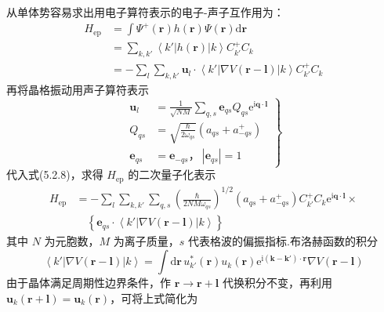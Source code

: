 从单体势容易求出用电子算符表示的电子-声子互作用为：
\begin{equation}
\begin{aligned}
  H_{\mathrm{ep}}&=\int\varPsi^{+}\left(\boldsymbol{r}\right)h\left(\boldsymbol{r}\right)\varPsi\left(\boldsymbol{r}\right)\mathrm{d}\boldsymbol{r}\\
  &=\sum_{k,k'}\left\langle k'\left|h\left(\boldsymbol{r}\right)\right|k\right\rangle C_{k'}^{+}C_k\\
  &=-\sum_{l}\sum_{k,k'}\boldsymbol{u}_l\cdot\left\langle k'\left|\nabla V\left(\boldsymbol{r}-\boldsymbol{l}\right)\right|k\right\rangle C_{k'}^{+}C_k
\end{aligned}
\end{equation}
再将晶格振动用声子算符表示
\begin{equation}
  \left.\begin{aligned}
  \boldsymbol{u}_l&=\frac{1}{\sqrt{NM}}\sum_{q,s}\boldsymbol{e}_{qs}Q_{qs}\mathrm{e}^{\mathrm{i}\boldsymbol{q}\cdot\boldsymbol{l}}\\
  Q_{qs}&=\sqrt{\frac{\hbar}{2\omega_{qs}}}\left(a_{qs}+a_{-qs}^{+}\right)\\
  \boldsymbol{e}_{qs}&=\boldsymbol{e}_{-qs}\text{，}\ \left|\boldsymbol{e}_{qs}\right|=1
  \end{aligned}\right\}
\end{equation}
代入式(5.2.8)，求得 $H_{\mathrm{ep}}$ 的二次量子化表示
\begin{equation}
\begin{aligned}
  H_{\mathrm{ep}}&=-\sum_{l}\sum_{k,k'}\sum_{q,s}\left(\frac{\hbar}{2NM\omega_{qs}}\right)^{1/2}
  \left(a_{qs}+a_{-qs}^{+}\right)C_{k'}^{+}C_k\mathrm{e}^{\mathrm{i}\boldsymbol{q}\cdot\boldsymbol{l}}\times\\
  &\quad\left\{\boldsymbol{e}_{qs}\cdot\left\langle k'\left|\nabla V\left(\boldsymbol{r}-\boldsymbol{l}\right)\right|k\right\rangle\right\}
\end{aligned}
\end{equation}
其中 $N$ 为元胞数，$M$ 为离子质量，$s$ 代表格波的偏振指标.布洛赫函数的积分
\begin{equation}
  \left\langle k'\left|\nabla V\left(\boldsymbol{r}-\boldsymbol{l}\right)\right|k\right\rangle
  =\int\mathrm{d}\boldsymbol{r}\,u_{k'}^{*}\left(\boldsymbol{r}\right)u_k\left(\boldsymbol{r}\right)
  \mathrm{e}^{\mathrm{i}\left(\boldsymbol{k}-\boldsymbol{k}'\right)\cdot\boldsymbol{r}}\nabla V\left(\boldsymbol{r}-\boldsymbol{l}\right)
\end{equation}
由于晶体满足周期性边界条件，作 $\boldsymbol{r}\to\boldsymbol{r}+\boldsymbol{l}$ 代换积分不变，再利用 $\boldsymbol{u}_k\left(\boldsymbol{r}+\boldsymbol{l}\right)=\boldsymbol{u}_k\left(\boldsymbol{r}\right)$，可将上式简化为
